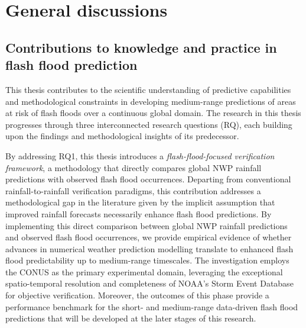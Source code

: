 \chapter{General discussions}
\label{general_discussions}
\graphicspath{{chapter_08/figures}{chapter_08/tables}}


\section{Contributions to knowledge and practice in flash flood prediction}
\label{general_introduction_contribution_to_knowledge}

This thesis contributes to the scientific understanding of predictive capabilities and methodological constraints in developing medium-range predictions of areas at risk of flash floods over a continuous global domain. The research in this thesis progresses through three interconnected research questions (RQ), each building upon the findings and methodological insights of its predecessor.

By addressing RQ1, this thesis introduces a \textit{flash-flood-focused verification framework}, a methodology that directly compares global NWP rainfall predictions with observed flash flood occurrences. Departing from conventional rainfall-to-rainfall verification paradigms, this contribution addresses a methodological gap in the literature given by the implicit assumption that improved rainfall forecasts necessarily enhance flash flood predictions. By implementing this direct comparison between global NWP rainfall predictions and observed flash flood occurrences, we provide empirical evidence of whether advances in numerical weather prediction modelling translate to enhanced flash flood predictability up to medium-range timescales. The investigation employs the CONUS as the primary experimental domain, leveraging the exceptional spatio-temporal resolution and completeness of NOAA's Storm Event Database for objective verification. Moreover, the outcomes of this phase provide a performance benchmark for the short- and medium-range data-driven flash flood predictions that will be developed at the later stages of this research. 

